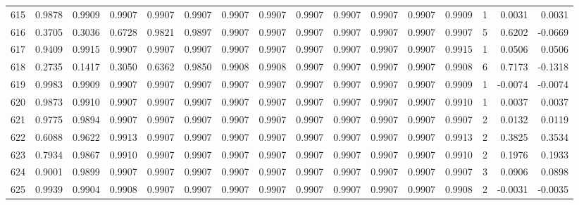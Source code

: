 \begin{tabular}{lrrrrrrrrrrrrrrr}
615 &      0.9878 &  0.9909 &  0.9907 &  0.9907 &  0.9907 &  0.9907 &  0.9907 &  0.9907 &  0.9907 &  0.9907 &   0.9907 &     0.9909 &      1 &                    0.0031 &                     0.0031 \\
616 &      0.3705 &  0.3036 &  0.6728 &  0.9821 &  0.9897 &  0.9907 &  0.9907 &  0.9907 &  0.9907 &  0.9907 &   0.9907 &     0.9907 &      5 &                    0.6202 &                    -0.0669 \\
617 &      0.9409 &  0.9915 &  0.9907 &  0.9907 &  0.9907 &  0.9907 &  0.9907 &  0.9907 &  0.9907 &  0.9907 &   0.9907 &     0.9915 &      1 &                    0.0506 &                     0.0506 \\
618 &      0.2735 &  0.1417 &  0.3050 &  0.6362 &  0.9850 &  0.9908 &  0.9908 &  0.9907 &  0.9907 &  0.9907 &   0.9907 &     0.9908 &      6 &                    0.7173 &                    -0.1318 \\
619 &      0.9983 &  0.9909 &  0.9907 &  0.9907 &  0.9907 &  0.9907 &  0.9907 &  0.9907 &  0.9907 &  0.9907 &   0.9907 &     0.9909 &      1 &                   -0.0074 &                    -0.0074 \\
620 &      0.9873 &  0.9910 &  0.9907 &  0.9907 &  0.9907 &  0.9907 &  0.9907 &  0.9907 &  0.9907 &  0.9907 &   0.9907 &     0.9910 &      1 &                    0.0037 &                     0.0037 \\
621 &      0.9775 &  0.9894 &  0.9907 &  0.9907 &  0.9907 &  0.9907 &  0.9907 &  0.9907 &  0.9907 &  0.9907 &   0.9907 &     0.9907 &      2 &                    0.0132 &                     0.0119 \\
622 &      0.6088 &  0.9622 &  0.9913 &  0.9907 &  0.9907 &  0.9907 &  0.9907 &  0.9907 &  0.9907 &  0.9907 &   0.9907 &     0.9913 &      2 &                    0.3825 &                     0.3534 \\
623 &      0.7934 &  0.9867 &  0.9910 &  0.9907 &  0.9907 &  0.9907 &  0.9907 &  0.9907 &  0.9907 &  0.9907 &   0.9907 &     0.9910 &      2 &                    0.1976 &                     0.1933 \\
624 &      0.9001 &  0.9899 &  0.9907 &  0.9907 &  0.9907 &  0.9907 &  0.9907 &  0.9907 &  0.9907 &  0.9907 &   0.9907 &     0.9907 &      3 &                    0.0906 &                     0.0898 \\
625 &      0.9939 &  0.9904 &  0.9908 &  0.9907 &  0.9907 &  0.9907 &  0.9907 &  0.9907 &  0.9907 &  0.9907 &   0.9907 &     0.9908 &      2 &                   -0.0031 &                    -0.0035 \\

\end{tabular}
